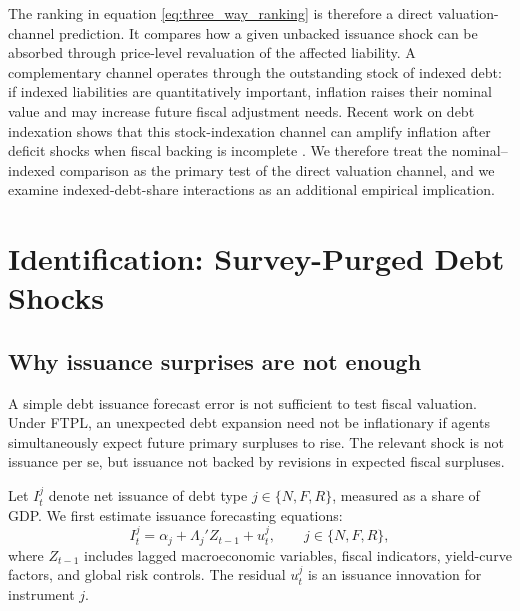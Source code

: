 \documentclass[12pt,a4paper]{article}
\begin{document}
The ranking in equation \eqref{eq:three_way_ranking}  is therefore a direct valuation-channel prediction. It compares how a given unbacked issuance shock can be absorbed through price-level revaluation of the affected liability. A complementary channel operates through the outstanding stock of indexed debt: if indexed liabilities are quantitatively important, inflation raises their nominal value and may increase future fiscal adjustment needs. Recent work on debt indexation shows that this stock-indexation channel can amplify inflation after deficit shocks when fiscal backing is incomplete \citep{Kawalec2025}. We therefore treat the nominal--indexed comparison as the primary test of the direct valuation channel, and we examine indexed-debt-share interactions as an additional empirical implication.




\section{Identification: Survey-Purged Debt Shocks}
\label{sec:identification}

\subsection{Why issuance surprises are not enough}

A simple debt issuance forecast error is not sufficient to test fiscal valuation. Under FTPL, an unexpected debt expansion need not be inflationary if agents simultaneously expect future primary surpluses to rise. The relevant shock is not issuance per se, but issuance not backed by revisions in expected fiscal surpluses.

Let \(I_t^j\) denote net issuance of debt type \(j\in\{N,F,R\}\), measured as a share of GDP. We first estimate issuance forecasting equations:
\begin{equation}
I_t^j
=
\alpha_j
+
\Lambda_j' Z_{t-1}
+u_t^j,
\qquad
j\in\{N,F,R\},
\label{eq:issuance_forecast}
\end{equation}
where \(Z_{t-1}\) includes lagged macroeconomic variables, fiscal indicators, yield-curve factors, and global risk controls. The residual \(u_t^j\) is an issuance innovation for instrument \(j\).
\end{document}
